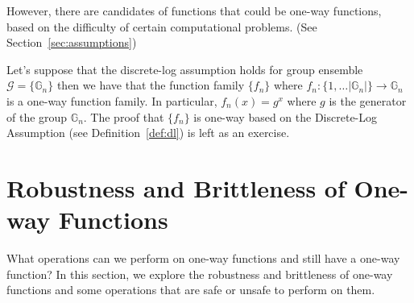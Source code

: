 However, there are candidates of functions that could be one-way functions, based on the difficulty of certain computational problems. (See Section~\ref{sec:assumptions})%
%


%
%
Let's suppose that the discrete-log assumption holds for group ensemble $\mathcal{G} = \{\mathbb{G}_n\}$ then we have that the function family $\{f_n\}$ where $f_n: \{1,\ldots |\mathbb{G}_n|\}\rightarrow \mathbb{G}_n$ is a one-way function family. In particular, $f_n(x) = g^x$ where $g$ is the generator of the group $\mathbb{G}_n$. The proof that $\{f_n\}$ is one-way based on the Discrete-Log Assumption (see Definition~\ref{def:dl}) is left as an exercise. 


\section{Robustness and Brittleness of One-way Functions}
What operations can we perform on one-way functions and still have a one-way function? In this section, we explore the robustness and brittleness of one-way functions and some operations that are safe or unsafe to perform on them.

